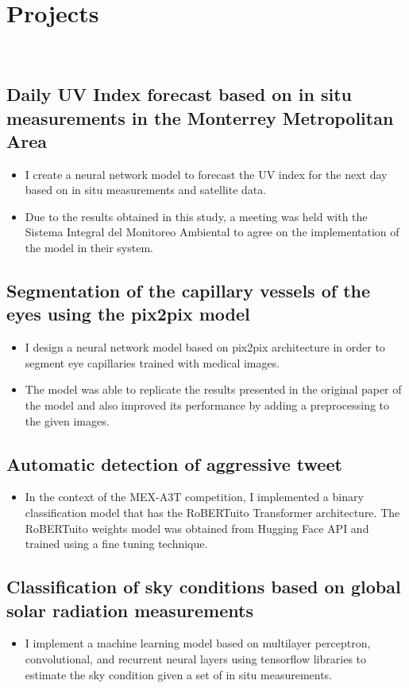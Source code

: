 \documentclass[a3paper]{adcv_color}
\begin{document}
\section{Projects}\\
\begin{addmargin}[0.5em]{0.5em}
	\subsection{Daily UV Index forecast based on in situ measurements in the Monterrey Metropolitan Area}
	\begin{itemize}
		\item I create a neural network model to forecast the UV index for the next day based on in situ measurements and satellite data.
		\item Due to the results obtained in this study, a meeting was held with the Sistema Integral del Monitoreo Ambiental to agree on the implementation of the model in their system.
	\end{itemize}
	\subsection{Segmentation of the capillary vessels of the eyes using the pix2pix model}
	\begin{itemize}
		\item I design a neural network model based on pix2pix architecture in order to segment eye capillaries trained with medical images.
		\item The model was able to replicate the results presented in the original paper of the model and also improved its performance by adding a preprocessing to the given images.
	\end{itemize}
	\subsection{Automatic detection of aggressive tweet}
	\begin{itemize}
		\item In the context of the MEX-A3T competition, I implemented a binary classification model that has the RoBERTuito Transformer architecture. The RoBERTuito weights model was obtained from Hugging Face API and trained using a fine tuning technique.
	\end{itemize}
	\subsection{Classification of sky conditions based on global solar radiation measurements}
	\begin{itemize}
		\item I implement a machine learning model based on multilayer perceptron, convolutional, and recurrent neural layers using tensorflow libraries to estimate the sky condition given a set of in situ measurements.
	\end{itemize}

\end{addmargin}
\end{document}
